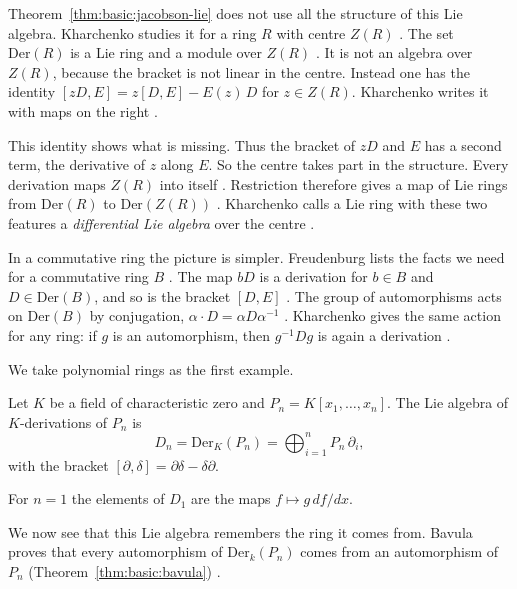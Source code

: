 Theorem~\ref{thm:basic:jacobson-lie} does not use all the structure of this Lie algebra. Kharchenko studies it for a ring $R$ with centre $Z(R)$ \cite[p.~7]{Kharchenko1991}. The set $\mathrm{Der}(R)$ is a Lie ring and a module over $Z(R)$ \cite[p.~7]{Kharchenko1991}. It is not an algebra over $Z(R)$, because
the bracket is not linear in the centre. Instead one has the identity
$[zD,E] = z[D,E] - E(z)\,D$ for $z \in Z(R)$. Kharchenko writes it with maps
on the right \cite[identity~(1), p.~7]{Kharchenko1991}.

This identity shows what is missing. Thus the bracket of $zD$ and $E$ has a second term, the derivative of $z$ along $E$. So the centre takes part in the structure. Every derivation maps $Z(R)$ into itself \cite[p.~8]{Kharchenko1991}. Restriction therefore
gives a map of Lie rings from $\mathrm{Der}(R)$ to $\mathrm{Der}(Z(R))$
\cite[p.~8]{Kharchenko1991}. Kharchenko calls a Lie ring with these two
features a \emph{differential Lie algebra} over the centre
\cite[Definition~1.2.3, p.~8]{Kharchenko1991}.

In a commutative ring the picture is simpler. %
Freudenburg lists the facts we need for a commutative ring $B$ \cite[p.~2]{Freudenburg2017}. The map $bD$ is a derivation for $b \in B$ and $D \in \mathrm{Der}(B)$, and so is the bracket $[D,E]$ \cite[(C.6), p.~2]{Freudenburg2017}. The group of automorphisms acts on $\mathrm{Der}(B)$ by conjugation,
$\alpha \cdot D = \alpha D \alpha^{-1}$ \cite[(C.5), (C.6), p.~2]{Freudenburg2017}.
Kharchenko gives the same action for any ring: if $g$ is an automorphism, then
$g^{-1} D g$ is again a derivation \cite[\S1.2.6, p.~11]{Kharchenko1991}.

We take polynomial rings as the first example.

\begin{example}\label{ex:basic:polynomials}
Let $K$ be a field of characteristic zero and $P_n=K[x_1,\dots,x_n]$. The Lie
algebra of $K$-derivations of $P_n$ is
\[
D_n=\mathrm{Der}_K(P_n)=\bigoplus_{i=1}^{n}P_n\,\partial_i ,
\]
with the bracket $[\partial,\delta]=\partial\delta-\delta\partial$.
\end{example}

For $n = 1$ the elements of $D_1$ are the maps $f \mapsto g\,df/dx$.

We now see that this Lie algebra remembers the ring it comes from. Bavula proves that every automorphism of $\mathrm{Der}_k(P_n)$ comes from an automorphism of $P_n$ (Theorem~\ref{thm:basic:bavula}) \cite[Theorem~1.1, p.~1]{Bavula2017}.

